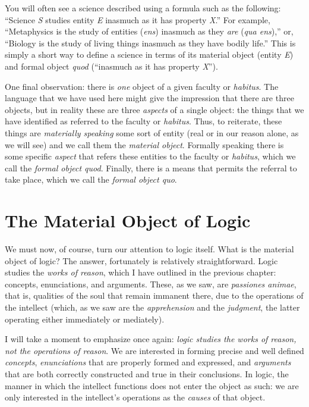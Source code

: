 \documentclass[
  12pt,
]{memoir}
\begin{document}
You will often see a science described using a formula such as the
following: ``Science \emph{S} studies entity \emph{E} inasmuch as it has
property \emph{X}.'' For example, ``Metaphysics is the study of entities
(\emph{ens}) inasmuch as they \emph{are} (\emph{qua ens}),'' or,
``Biology is the study of living things inasmuch as they have bodily
life.'' This is simply a short way to define a science in terms of its
material object (entity \emph{E}) and formal object \emph{quod}
(``inasmuch as it has property \emph{X}'').

One final observation: there is \emph{one} object of a given faculty or
\emph{habitus}. The language that we have used here might give the
impression that there are three objects, but in reality these are three
\emph{aspects} of a single object: the things that we have identified as
referred to the faculty or \emph{habitus}. Thus, to reiterate, these
things are \emph{materially speaking} some sort of entity (real or in
our reason alone, as we will see) and we call them the \emph{material
object}. Formally speaking there is some specific \emph{aspect} that
refers these entities to the faculty or \emph{habitus}, which we call
the \emph{formal object quod}. Finally, there is a means that permits
the referral to take place, which we call the \emph{formal object quo}.

\section{The Material Object of
Logic}\label{the-material-object-of-logic}

We must now, of course, turn our attention to logic itself. What is the
material object of logic? The answer, fortunately is relatively
straightforward. Logic studies the \emph{works of reason}, which I have
outlined in the previous chapter: concepts, enunciations, and arguments.
These, as we saw, are \emph{passiones animae}, that is, qualities of the
soul that remain immanent there, due to the operations of the intellect
(which, as we saw are the \emph{apprehension} and the \emph{judgment},
the latter operating either immediately or mediately).

I will take a moment to emphasize once again: \emph{logic studies the
works of reason, not the operations of reason}. We are interested in
forming precise and well defined \emph{concepts}, \emph{enunciations}
that are properly formed and expressed, and \emph{arguments} that are
both correctly constructed and true in their conclusions. In logic, the
manner in which the intellect functions does not enter the object as
such: we are only interested in the intellect's operations as the
\emph{causes} of that object.
\end{document}
